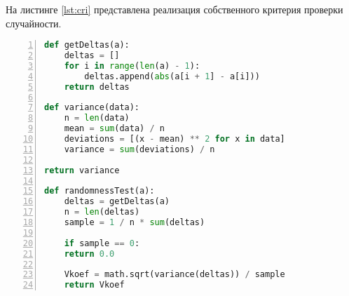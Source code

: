 На листинге \ref{lst:cri} представлена реализация собственного критерия проверки случайности.
\begin{lstlisting}[language=Python,
    frame= tb,
    numbers=left,
    numberstyle=\footnotesize,
    caption={Реализация собственного критерия проверки случайности},
    label={lst:cri}]
def getDeltas(a):
    deltas = []
    for i in range(len(a) - 1):
        deltas.append(abs(a[i + 1] - a[i]))
    return deltas

def variance(data):
    n = len(data)
    mean = sum(data) / n
    deviations = [(x - mean) ** 2 for x in data]
    variance = sum(deviations) / n

return variance

def randomnessTest(a):
    deltas = getDeltas(a)
    n = len(deltas)
    sample = 1 / n * sum(deltas)

    if sample == 0:
    return 0.0

    Vkoef = math.sqrt(variance(deltas)) / sample
    return Vkoef 
\end{lstlisting}